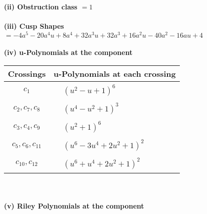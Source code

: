 \documentclass[1p]{elsarticle_modified}
\theoremstyle{definition}
\begin{document}
\flushleft \textbf{(ii) Obstruction class $= 1$}\\~\\
\flushleft \textbf{(iii) Cusp Shapes $= -4 a^5-20 a^4 u+8 a^4+32 a^3 u+32 a^3+16 a^2 u-40 a^2-16 a u+4$}\\~\\
\newpage\renewcommand{\arraystretch}{1}
\flushleft \textbf{(iv) u-Polynomials at the component}\newline \\
\begin{tabular}{m{50pt}|m{274pt}}
Crossings & \hspace{64pt}u-Polynomials at each crossing \\
\hline $$\begin{aligned}c_{1}\end{aligned}$$&$\begin{aligned}
&(u^2- u+1)^6
\end{aligned}$\\
\hline $$\begin{aligned}c_{2},c_{7},c_{8}\end{aligned}$$&$\begin{aligned}
&(u^4- u^2+1)^3
\end{aligned}$\\
\hline $$\begin{aligned}c_{3},c_{4},c_{9}\end{aligned}$$&$\begin{aligned}
&(u^2+1)^6
\end{aligned}$\\
\hline $$\begin{aligned}c_{5},c_{6},c_{11}\end{aligned}$$&$\begin{aligned}
&(u^6-3 u^4+2 u^2+1)^2
\end{aligned}$\\
\hline $$\begin{aligned}c_{10},c_{12}\end{aligned}$$&$\begin{aligned}
&(u^6+u^4+2 u^2+1)^2
\end{aligned}$\\
\hline
\end{tabular}\\~\\
\newpage\renewcommand{\arraystretch}{1}
\flushleft \textbf{(v) Riley Polynomials at the component}\newline \\
\end{document}
